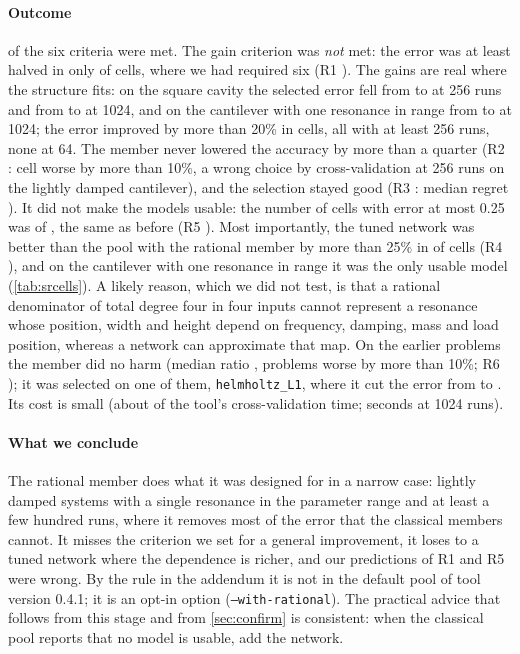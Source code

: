 \paragraph{Outcome} \SrMetCount{} of the six criteria were met. The gain criterion was \emph{not} met: the error was at least halved in only \SrOneK{} of \SrOneN{} cells, where we had required six (R1 \SrOneVerdict). The gains are real where the structure fits: on the square cavity the selected error fell from \SrATwofiftysixOld{} to \SrATwofiftysixNew{} at 256 runs and from \SrATentwentyfourOld{} to \SrATentwentyfourNew{} at 1024, and on the cantilever with one resonance in range from \SrBTentwentyfourOld{} to \SrBTentwentyfourNew{} at 1024; the error improved by more than 20\% in \SrFBetterFifth{} cells, all with at least 256 runs, none at 64. The member never lowered the accuracy by more than a quarter (R2 \SrTwoVerdict: \SrTwoWorse{} cell worse by more than 10\%, a wrong choice by cross-validation at 256 runs on the lightly damped cantilever), and the selection stayed good (R3 \SrThreeVerdict: median regret \SrThreeMedian). It did not make the models usable: the number of cells with error at most 0.25 was \SrFiveNew{} of \SrFiveN{}, the same as before (R5 \SrFiveVerdict). Most importantly, the tuned network was better than the pool with the rational member by more than 25\% in \SrFourK{} of \SrFourN{} cells (R4 \SrFourVerdict), and on the cantilever with one resonance in range it was the only usable model (\cref{tab:srcells}). A likely reason, which we did not test, is that a rational denominator of total degree four in four inputs cannot represent a resonance whose position, width and height depend on frequency, damping, mass and load position, whereas a network can approximate that map. On the \SrSixN{} earlier problems the member did no harm (median ratio \SrSixMedian, \SrSixWorse{} problems worse by more than 10\%; R6 \SrSixVerdict); it was selected on one of them, \texttt{helmholtz\_L1}, where it cut the error from \SrHHelmOld{} to \SrHHelmNew{}. Its cost is small (about \SrRatShare{} of the tool's cross-validation time; \SrRatSecTentwentyfour{} seconds at 1024 runs).
\paragraph{What we conclude} The rational member does what it was designed for in a narrow case: lightly damped systems with a single resonance in the parameter range and at least a few hundred runs, where it removes most of the error that the classical members cannot. It misses the criterion we set for a general improvement, it loses to a tuned network where the dependence is richer, and our predictions of R1 and R5 were wrong. By the rule in the addendum it is not in the default pool of tool version 0.4.1; it is an opt-in option (\texttt{--with-rational}). The practical advice that follows from this stage and from \cref{sec:confirm} is consistent: when the classical pool reports that no model is usable, add the network.

